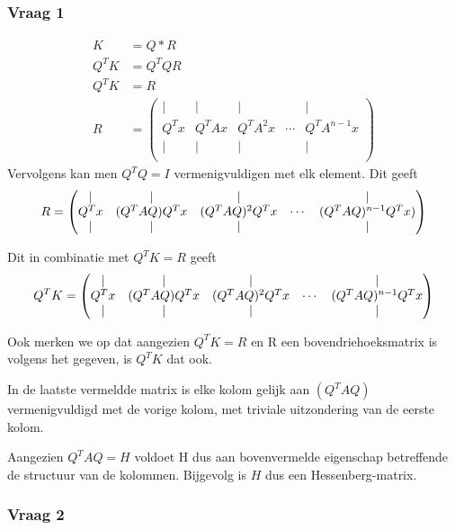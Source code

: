 \documentclass{article}
\begin{document}
\subsubsection*{Vraag 1}
\begin{align*}
    K&=Q*R\\
    Q^TK&=Q^TQR \\
    Q^TK&=R  \tag{$Q^TQ=I$ aangezien $Q$ orthogonaal is.}\\
    R &= 
    \begin{pmatrix}
        | & | & | &  & |\\
        Q^{T}x & Q^{T}Ax & Q^TA^2x & \cdots & Q^TA^{n-1}x \\
        | & | & | &  & |\\
    \end{pmatrix}
\end{align*}
Vervolgens kan men $Q^TQ=I$ vermenigvuldigen met elk element. Dit geeft
 \[
 R =
 \begin{pmatrix}
 \centering
        | & | & | &  & |\\
        Q^Tx& (Q^TAQ)Q^Tx& (Q^TAQ)^2Q^Tx & \cdots &(Q^TAQ)^{n-1}Q^Tx) \\
        | & | & | &  & |\\
\end{pmatrix}
\]

Dit in combinatie met $Q^TK=R$ geeft
\[
Q^TK =
\begin{pmatrix}
\centering
        | & | & | &  & |\\
        Q^Tx & (Q^TAQ)Q^Tx & (Q^TAQ)^2Q^Tx  & \cdots & (Q^TAQ)^{n-1}Q^Tx  \\
        | & | & | &  & |\\
\end{pmatrix}
\]

Ook merken we op dat aangezien $Q^TK=R$ en R een bovendriehoeksmatrix is volgens het gegeven, is $Q^TK$ dat ook.

In de laatste vermeldde matrix is elke kolom gelijk aan $(Q^TAQ)$ vermenigvuldigd met de vorige kolom, met triviale uitzondering van de eerste kolom.

Aangezien $Q^TAQ=H$ voldoet H dus aan bovenvermelde eigenschap betreffende de structuur van de kolommen. Bijgevolg is $H$ dus een Hessenberg-matrix.



\subsubsection*{Vraag 2}
\end{document}
